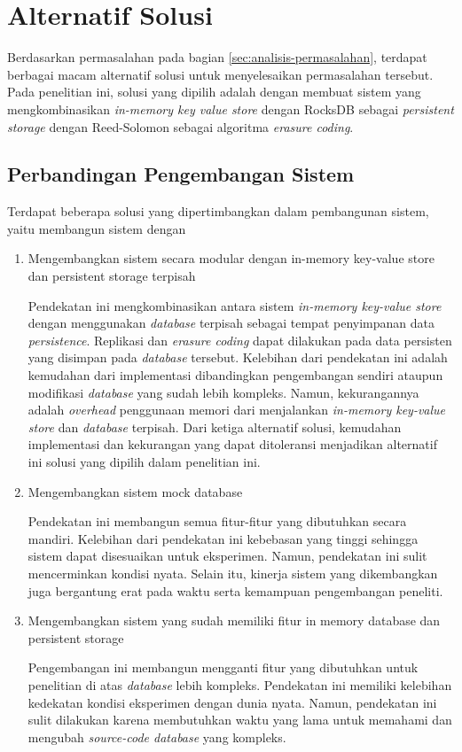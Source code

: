 \section{Alternatif Solusi}
\label{sec:alternatif-solusi}

Berdasarkan permasalahan pada bagian \ref{sec:analisis-permasalahan}, terdapat berbagai macam alternatif solusi untuk menyelesaikan permasalahan tersebut. Pada penelitian ini, solusi yang dipilih adalah dengan membuat sistem yang mengkombinasikan \textit{in-memory key value store} dengan RocksDB sebagai \textit{persistent storage} dengan Reed-Solomon sebagai algoritma \textit{erasure coding}.

\subsection{Perbandingan Pengembangan Sistem}

Terdapat beberapa solusi yang dipertimbangkan dalam pembangunan sistem, yaitu membangun sistem dengan 

\begin{enumerate}
  \item Mengembangkan sistem secara modular dengan in-memory key-value store dan persistent storage terpisah
  
  Pendekatan ini mengkombinasikan antara sistem \textit{in-memory key-value store} dengan menggunakan \textit{database} terpisah sebagai tempat penyimpanan data \textit{persistence}. Replikasi dan \textit{erasure coding} dapat dilakukan pada data persisten yang disimpan pada \textit{database} tersebut. Kelebihan dari pendekatan ini adalah kemudahan dari implementasi dibandingkan pengembangan sendiri ataupun modifikasi \textit{database} yang sudah lebih kompleks. Namun, kekurangannya adalah \textit{overhead} penggunaan memori dari menjalankan \textit{in-memory key-value store} dan \textit{database} terpisah. Dari ketiga alternatif solusi, kemudahan implementasi dan kekurangan yang dapat ditoleransi menjadikan alternatif ini solusi yang dipilih dalam penelitian ini.


  \item Mengembangkan sistem mock database
  
  Pendekatan ini membangun semua fitur-fitur yang dibutuhkan secara mandiri. Kelebihan dari pendekatan ini kebebasan yang tinggi sehingga sistem dapat disesuaikan untuk eksperimen. Namun, pendekatan ini sulit mencerminkan kondisi nyata. Selain itu, kinerja sistem yang dikembangkan juga bergantung erat pada waktu serta kemampuan pengembangan peneliti.

  \item Mengembangkan sistem yang sudah memiliki fitur in memory database dan persistent storage
  
  Pengembangan ini membangun mengganti fitur yang dibutuhkan untuk penelitian di atas \textit{database} lebih kompleks. Pendekatan ini memiliki kelebihan kedekatan kondisi eksperimen dengan dunia nyata. Namun, pendekatan ini sulit dilakukan karena membutuhkan waktu yang lama untuk memahami dan mengubah \textit{source-code database} yang kompleks.
\end{enumerate}

